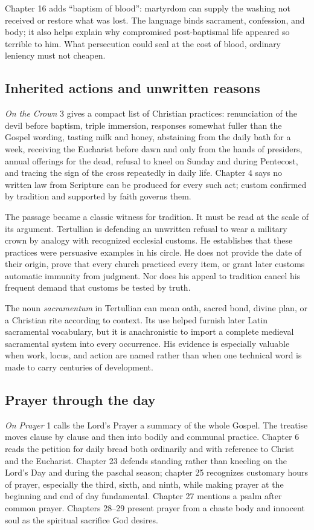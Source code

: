 Chapter 16 adds ``baptism of blood'': martyrdom can supply the washing not
received or restore what was lost. The language binds sacrament, confession,
and body; it also helps explain why compromised post-baptismal life appeared so
terrible to him. What persecution could seal at the cost of blood, ordinary
leniency must not cheapen.

\subsection{Inherited actions and unwritten reasons}

\emph{On the Crown} 3 gives a compact list of Christian practices: renunciation
of the devil before baptism, triple immersion, responses somewhat fuller than
the Gospel wording, tasting milk and honey, abstaining from the daily bath for
a week, receiving the Eucharist before dawn and only from the hands of
presiders, annual offerings for the dead, refusal to kneel on Sunday and during
Pentecost, and tracing the sign of the cross repeatedly in daily life. Chapter
4 says no written law from Scripture can be produced for every such act; custom
confirmed by tradition and supported by faith governs them.

The passage became a classic witness for tradition. It must be read at the
scale of its argument. Tertullian is defending an unwritten refusal to wear a
military crown by analogy with recognized ecclesial customs. He establishes
that these practices were persuasive examples in his circle. He does not
provide the date of their origin, prove that every church practiced every item,
or grant later customs automatic immunity from judgment. Nor does his appeal to
tradition cancel his frequent demand that customs be tested by truth.

The noun \emph{sacramentum} in Tertullian can mean oath, sacred bond, divine
plan, or a Christian rite according to context. Its use helped furnish later
Latin sacramental vocabulary, but it is anachronistic to import a complete
medieval sacramental system into every occurrence. His evidence is especially
valuable when work, locus, and action are named rather than when one technical
word is made to carry centuries of development.

\subsection{Prayer through the day}

\emph{On Prayer} 1 calls the Lord's Prayer a summary of the whole Gospel. The
treatise moves clause by clause and then into bodily and communal practice.
Chapter 6 reads the petition for daily bread both ordinarily and with reference
to Christ and the Eucharist. Chapter 23 defends standing rather than kneeling on
the Lord's Day and during the paschal season; chapter 25 recognizes customary
hours of prayer, especially the third, sixth, and ninth, while making prayer at
the beginning and end of day fundamental. Chapter 27 mentions a psalm after
common prayer. Chapters 28--29 present prayer from a chaste body and innocent
soul as the spiritual sacrifice God desires.

